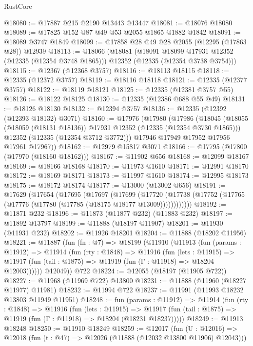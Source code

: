 \begin{lexlean}{RustCore}
\begin{coremodule}
@18080 := @17887 @215 @2190 @13443 @13447
@18081 := @18076 @18080
@18089 := @17825 @152 @87 @49 @53 @2055 @1865 @1882 @1842
@18091 := @18089 @3747 @1849
@18099 := @17858 @28 @49 @28 @2055 (@12295 (@17863 @28)) @12939
@18113 := @18066
    (@18081
      (@18091 @18099 @17931 @12352 (@12335 (@12354 @3748 @1865)))
      @12352
      (@12335 (@12354 @3738 @3754)))
@18115 := @12367 (@12368 @3757)
@18116 := @18113 @18115
@18118 := @12335 (@12372 @3757)
@18119 := @18116 @18118
@18121 := @12335 (@12377 @3757)
@18122 := @18119 @18121
@18125 := @12335 (@12381 @3757 @55)
@18126 := @18122 @18125
@18130 := @12335 (@12386 @688 @55 @49)
@18131 := @18126 @18130
@18132 := @12394 @3757
@18136 := @12335 (@12392 (@12393 @18132) @3071)
@18160 := @17976
    (@17980
      (@17986
        (@18045
          (@18055 (@18059 (@18131 @18136)) @17931 @12352 (@12335 (@12354 @3730 @1865)))
          @12352
          (@12335 (@12354 @3712 @3772)))
        @17946
        @17949
        @17952
        @17956
        @17961
        @17967))
@18162 := @12979 @15817 @3071
@18166 := @17795 (@17800 (@17970 (@18160 @18162)))
@18167 := @11902 @656
@18168 := @12099 @18167
@18169 := @18166 @18168
@18170 := @11973 @1610
@18171 := @12991 @18170
@18172 := @18169 @18171
@18173 := @11997 @1610
@18174 := @12995 @18173
@18175 := @18172 @18174
@18177 := @13000 (@13002 @656)
@18191 := @17629
    (@17654
      (@17695
        (@17697
          (@17699
            (@17720
              (@17738 (@17752 (@17765 (@17776 (@17780 (@17785 (@18175 @18177 @13009))))))))))))
@18192 := @11871 @232
@18196 := @11873 (@11877 @232) (@11883 @232)
@18197 := @11892 @13797
@18199 := @11888 (@18197 @11907)
@18201 := @11930 (@11931 @232)
@18202 := @11926 @18201
@18204 := @11888 (@18202 @11956)
@18221 := @11887
    (fun (fn : @7) =>
    @18199
      (@11910
        (@11913
          (fun (params : @11912) =>
          @11914
            (fun (rty : @1848) =>
            @11916
              (fun (lets : @11915) =>
              @11917 (fun (tail : @1875) => @11919 (fun (Γ : @11918) => @18204 @12003))))))
        @12049))
    @722
@18224 := @12055 (@18197 (@11905 @722))
@18227 := @11968 (@11969 @722) @13800
@18231 := @11888 (@11960 (@18227 @11977) @11981)
@18232 := @11994 @722
@18237 := @11991 (@11993 @18232 @13803 @11949 @11951)
@18248 := fun (params : @11912) =>
  @11914
    (fun (rty : @1848) =>
    @11916
      (fun (lets : @11915) =>
      @11917 (fun (tail : @1875) => @11919 (fun (Γ : @11918) => @18204 (@18231 @18237)))))
@18249 := @11913 @18248
@18250 := @11910 @18249
@18259 := @12017
    (fun (U : @12016) => @12018 (fun (t : @47) => @12026 (@11888 (@12032 @13800 @11906) @12043)))

\end{coremodule}
\end{lexlean}
